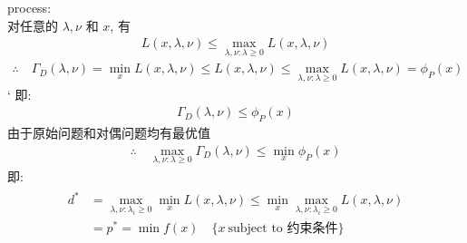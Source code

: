 \documentclass[oneside, 12pt]{ctexbook}
\begin{document}
\begin{enumerate}
					 process:\\
						 对任意的 $\lambda, \nu$ 和 $x$, 有
						 	\begin{align}
					 			L(x, \lambda, \nu) \leq \max\limits_{\lambda, \nu : \lambda \geq 0} L(x, \lambda, \nu)
					 		\end{align}
					 		\begin{align}
					 			\therefore \quad  \Gamma_D (\lambda, \nu) = \min\limits_x L(x, \lambda, \nu) \leq L(x, \lambda, \nu) \leq \max\limits_{\lambda, \nu : \lambda \geq 0} L(x, \lambda, \nu) = \phi_P (x)
					 		\end{align}
					 `	即: 
					 		\begin{align}
					 			\Gamma_D (\lambda, \nu) \leq \phi_P (x)
					 		\end{align}
					 	由于原始问题和对偶问题均有最优值
					 		\begin{align}
					 			\therefore \quad \max\limits_{\lambda, \nu : \lambda \geq 0} \Gamma_D (\lambda, \nu) \leq \min\limits_x \phi_P (x)
					 		\end{align}
					 	即:
					 		\begin{align}
					 			\begin{split}
					 				d^* &= \max\limits_{\lambda, \nu: \lambda_i \geq 0} \min\limits_x L(x, \lambda, \nu) \leq 	\min\limits_x\max\limits_{\lambda, \nu: \lambda_i \geq 0} L(x, \lambda, \nu) \\
					 				&= p^* = \min f(x) \quad \{ x \ \text{subject to 约束条件} \}
					 			\end{split}
					 		\end{align}
					 						 	

\end{enumerate}
\end{document}
